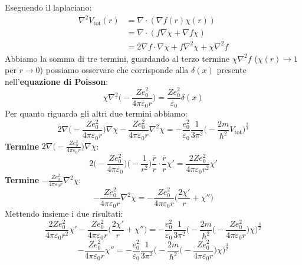 Eseguendo il laplaciano:
\begin{equation*}
    \begin{aligned}
        \nabla^2V_{\text{tot}}(r) & =\nabla\cdot(\nabla f(r)\chi(r)) \\
        & = \nabla \cdot (f\nabla\chi+\nabla f\chi)\\
        & = 2\nabla f \cdot \nabla \chi + f \nabla^2\chi+\chi\nabla^2 f
    \end{aligned}
\end{equation*}
Abbiamo la somma di tre termini, guardando al terzo termine $\chi\nabla^2 f$ ($\chi(r)\rightarrow 1$ per $r\rightarrow 0$) possiamo osservare che corrisponde alla $\delta(x)$ presente nell'\textbf{equazione di Poisson}:
\begin{equation*}
    \chi\nabla^2\bigg(-\frac{Ze_0^2}{4\pi\varepsilon_0r}\bigg)=\frac{Ze_0^2}{\varepsilon_0}\delta(x)
\end{equation*}
Per quanto riguarda gli altri due termini abbiamo:
\begin{equation*}
    2\nabla\bigg(-\frac{Ze_0^2}{4\pi\varepsilon_0r}\bigg)\nabla\chi-\frac{Ze_0^2}{4\pi\varepsilon_0r}\nabla^2\chi=-\frac{e_0^2}{\varepsilon_0}\frac{1}{3\pi^2}\bigg(-\frac{2m}{\hbar^2}V_{\text{tot}}\bigg)^{\frac23}
\end{equation*}
\textbf{Termine} $2\nabla\bigg(-\frac{Ze_0^2}{4\pi\varepsilon_0r}\bigg)\nabla\chi$:
\begin{equation*}
    2\bigg(-\frac{Ze_0^2}{4\pi\varepsilon_0}\bigg)\bigg(-\frac 1{r^2}\bigg)\frac{\overline r}{r}\cdot\frac{\overline r}{r}\chi'=\frac{2Ze_0^2}{4\pi\varepsilon_0r^2}\chi'
\end{equation*}
\textbf{Termine} $-\frac{Ze_0^2}{4\pi\varepsilon_0r}\nabla^2\chi$:
\begin{equation*}
    -\frac{Ze_0^2}{4\pi\varepsilon_0r}\nabla^2\chi=-\frac{Ze_0^2}{4\pi\varepsilon_0r}\bigg(\frac{2\chi'}{r}+\chi''\bigg)
\end{equation*}
Mettendo insieme i due risultati:
\begin{equation*}
    \frac{2Ze_0^2}{4\pi\varepsilon_0r^2}\chi'-\frac{Ze_0^2}{4\pi\varepsilon_0r}\bigg(\frac{2\chi'}{r}+\chi''\bigg)=-\frac{e_0^2}{\varepsilon_0}\frac{1}{3\pi^2}\bigg(-\frac{2m}{\hbar^2}\bigg(-\frac{Ze_0^2}{4\pi\varepsilon_0r}\bigg)\chi\bigg)^{\frac32}
\end{equation*}
\begin{equation*}
    -\frac{Ze_0^2}{4\pi\varepsilon_0r}\chi''=-\frac{e_0^2}{\varepsilon_0}\frac{1}{3\pi^2}\bigg(-\frac{2m}{\hbar^2}\bigg(-\frac{Ze_0^2}{4\pi\varepsilon_0r}\bigg)\chi\bigg)^{\frac32}
\end{equation*}
